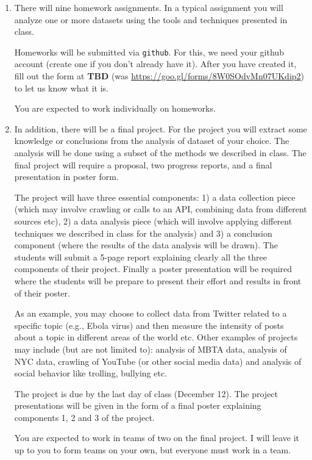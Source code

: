 \documentclass[11pt]{article}
\begin{document}
\begin{enumerate}
\item There will nine homework assignments.  In a typical 
assignment you will 
analyze one or more datasets using the tools and techniques presented in
class.

Homeworks will be submitted via \texttt{github}.   For this, we
  need your github account (create one if you don't already have it).
  After you have created it, fill out the form at \textbf{TBD}
  (was \url{https://goo.gl/forms/8W0SOdvMn07UKdip2}) to let us know what it is.

You are expected to work individually on homeworks.

\item In addition, there will be a final project.  For the project you
  will extract some
knowledge or conclusions from the analysis of dataset of your choice. The analysis
will be done using a subset of the methods we described in class.  The
final project will require a proposal, two progress reports, and a final
presentation in poster form.

The project will have three essential components: 1) a data collection
piece (which may involve crawling or calls to an API, combining data
from different sources etc), 2) a data analysis piece (which will
involve applying different techniques we described in class for the
analysis) and 3) a conclusion component (where the results of the data
analysis will be drawn).  The students will submit a 5-page report
explaining clearly all the three components of their project. Finally a
poster presentation will be required where the students will be prepare
to present their effort and results in front of their poster. 

As an example, you may choose to collect data from Twitter related
to a specific topic (e.g., Ebola virus) and then measure the intensity
of posts about a topic in different areas of the world etc.  Other
examples of projects may include (but are not limited to): analysis of
MBTA data, analysis of NYC data, crawling of YouTube (or other social
media data) and analysis of social behavior like trolling, bullying
etc. 

The project is due by the last day of class (December 12). The project presentations will be
given in the form of a final poster explaining components 1, 2 and 3 of
the project. 

You are expected to work in teams of two on the final project.   I will
leave it up to you to form teams on your own, but everyone must work in
a team.

\end{enumerate}
\end{document}
